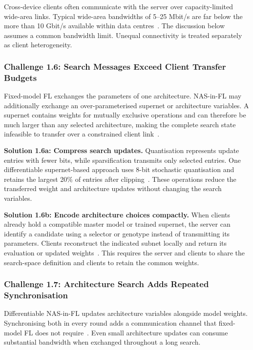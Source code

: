 Cross-device clients often communicate with the server over capacity-limited wide-area links. Typical wide-area bandwidths of 5--25 Mbit/s are far below the more than 10 Gbit/s available within data centres~\cite{peaches_2024}. The discussion below assumes a common bandwidth limit. Unequal connectivity is treated separately as client heterogeneity.

\subsubsection{Challenge 1.6: Search Messages Exceed Client Transfer Budgets}

Fixed-model FL exchanges the parameters of one architecture. NAS-in-FL may additionally exchange an over-parameterised supernet or architecture variables. A supernet contains weights for mutually exclusive operations and can therefore be much larger than any selected architecture, making the complete search state infeasible to transfer over a constrained client link~\cite{fedoras_2022,hapfnas_2025}.

\noindent\textbf{Solution 1.6a: Compress search updates.} Quantisation represents update entries with fewer bits, while sparsification transmits only selected entries. One differentiable supernet-based approach uses 8-bit stochastic quantisation and retains the largest 20\% of entries after clipping~\cite{fedregnas_2025}. These operations reduce the transferred weight and architecture updates without changing the search variables.

\noindent\textbf{Solution 1.6b: Encode architecture choices compactly.} When clients already hold a compatible master model or trained supernet, the server can identify a candidate using a selector or genotype instead of transmitting its parameters. Clients reconstruct the indicated subnet locally and return its evaluation or updated weights~\cite{rt_fed_evo_nas_2020,medical_image_segmentation_fednas_2024,intrusion_detection_fednas_2024}. This requires the server and clients to share the search-space definition and clients to retain the common weights.

\subsubsection{Challenge 1.7: Architecture Search Adds Repeated Synchronisation}

Differentiable NAS-in-FL updates architecture variables alongside model weights. Synchronising both in every round adds a communication channel that fixed-model FL does not require~\cite{fednas_2021,fedregnas_2025}. Even small architecture updates can consume substantial bandwidth when exchanged throughout a long search.

